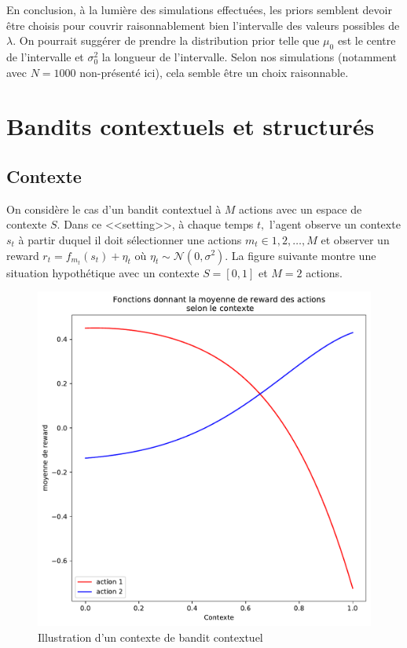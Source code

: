 \documentclass[letterpaper,11pt]{article}
\begin{document}
En conclusion, à la lumière des simulations effectuées, les priors semblent devoir être choisis pour couvrir raisonnablement bien l'intervalle des valeurs possibles de $\lambda.$ On pourrait suggérer de prendre la distribution prior telle que $\mu_0$ est le centre de l'intervalle et $\sigma^2_0$ la longueur de l'intervalle. Selon nos simulations (notamment avec $N=1000$ non-présenté ici), cela semble être un choix raisonnable.

\section{Bandits contextuels et structurés}

\subsection{Contexte}

On considère le cas d'un bandit contextuel à $M$ actions avec un espace de contexte $S.$ Dans ce <<setting>>, à chaque temps $t,$ l'agent observe un contexte $s_t$ à partir duquel il doit sélectionner une actions $m_t\in{1,2,\ldots,M}$ et observer un reward $r_t=f_{m_t}(s_t)+\eta_t$ où $\eta_t\sim\mathcal{N}(0,\sigma^2).$ La figure suivante montre une situation hypothétique avec un contexte $S=[0,1]$ et $M=2$ actions.

\begin{figure}[H]
\caption{Illustration d'un contexte de bandit contextuel}\label{figure: contexte}
\begin{center}
\includegraphics[scale=0.5]{image_contexte_no4.pdf}
\end{center}
\end{figure}
\end{document}
